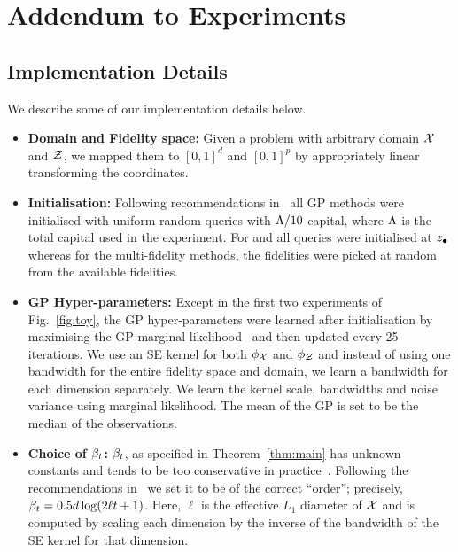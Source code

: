
\section{Addendum to Experiments}
\label{sec:appExperiments}

\subsection{Implementation Details}
\label{sec:appImplementation}

We describe some of our implementation details below.
\begin{itemize}[leftmargin=0.0in]
\vspace{-0.05in}
\item[]
\textbf{Domain and Fidelity space:}
Given a problem with arbitrary domain $\mathcal{X}$ and $\mathcal{Z}$, we mapped them to
$[0,1]^d$ and $[0,1]^p$ by appropriately linear transforming the coordinates.

\item[]
\textbf{Initialisation:}
Following recommendations in~\citet{brochu12bo}
all GP methods were initialised with uniform random
queries with $\Lambda/10$ capital, where $\Lambda$ is the total capital used in the
experiment.
For \gpucbs and \gpeis all queries were initialised at $z_{\bullet}$ whereas
for the multi-fidelity methods, the fidelities were picked at random from
the available fidelities.

\item[]
\textbf{GP Hyper-parameters:}
Except in the first two experiments of Fig.~\ref{fig:toy},
the GP hyper-parameters were learned after initialisation by maximising
the GP marginal likelihood~\citep{rasmussen06gps} and then updated every 25 iterations.
We use an SE kernel for both $\phi_{\mathcal{X}}$ and $\phi_{\mathcal{Z}}$ and
instead of using one bandwidth for the entire fidelity space and domain, we learn
a bandwidth for each dimension separately.
We learn the kernel scale, bandwidths and noise variance using marginal likelihood.
The mean of the GP is set to be the median of the observations.

\vspace{-0.05in}
\item[]
\textbf{Choice of $\beta_t$:} $\beta_t$, as specified in Theorem~\ref{thm:main} has unknown
constants and tends to be too conservative in practice~\citep{srinivas10gpbandits}.
Following the recommendations in~\citet{kandasamy15addBO} we  set it to be of
the correct ``order''; precisely, $\beta_t = 0.5d\log(2\ell t + 1)$. 
Here, $\ell$ is the effective $L_1$ diameter of $\mathcal{X}$ and is computed by scaling
each dimension by the inverse of the bandwidth of the SE kernel for that dimension.


\end{itemize}
